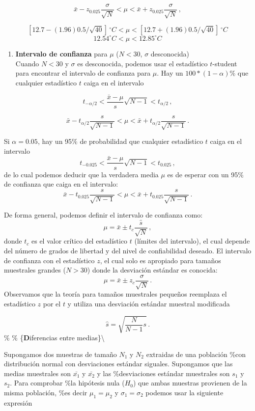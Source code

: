 \documentclass[
]{agujournal2019}
\providecommand{\tightlist}{%
  \setlength{\itemsep}{0pt}\setlength{\parskip}{0pt}}\usepackage{longtable,booktabs,array}
\begin{document}
\[\bar{x}-z_{0.025}\frac{\sigma}{\sqrt{N}}<\mu<\bar{x}+z_{0.025}\frac{\sigma}{\sqrt{N}}\,,\]

\[\left[12.7-(1.96)0.5/\sqrt{40}\right]\,^\circ{C}<\mu<\left[12.7+(1.96)0.5/\sqrt{40}\right]\,^\circ{C}\]
\[12.54^\circ{C} < \mu < 12.85^\circ{C}\]

\begin{enumerate}
\def\labelenumi{(\arabic{enumi})}
\setcounter{enumi}{1}
\tightlist
\item
  \textbf{Intervalo de confianza} para \(\mu\) (\(N<30\), \(\sigma\)
  desconocida)\\
  Cuando \(N<30\) y \(\sigma\) es desconocida, podemos usar el
  estadístico \(t\)-student para encontrar el intervalo de confianza
  para \(\mu\). Hay un \(100*(1-\alpha)\%\) que cualquier estadístico
  \(t\) caiga en el intervalo
\end{enumerate}

\[t_{-\alpha/2}<\frac{\bar{x}-\mu}{s}\sqrt{N-1}<t_{\alpha/2}\,,\]

\[\bar{x}-t_{\alpha/2}\frac{s}{\sqrt{N-1}} < \mu <
   \bar{x}+t_{\alpha/2}\frac{s}{\sqrt{N-1}}\,.\]

Si \(\alpha=0.05\), hay un 95\% de probabilidad que cualquier
estadístico \(t\) caiga en el intervalo
\[t_{-0.025}<\frac{\bar{x}-\mu}{s}\sqrt{N-1}<t_{0.025}\,,\] de lo cual
podemos deducir que la verdadera media \(\mu\) es de esperar con un 95\%
de confianza que caiga en el intervalo:
\[\bar{x}-t_{0.025}\frac{s}{\sqrt{N-1}}<\mu<\bar{x}+t_{0.025}\frac{s}{\sqrt{N-1}}\,.\]

De forma general, podemos definir el intervalo de confianza como:
\[\mu=\bar{x}\pm t_c\frac{\hat{s}}{\sqrt{N}}\,,\] donde \(t_c\) es el
valor crítico del estadístico \(t\) (límites del intervalo), el cual
depende del número de grados de libertad y del nivel de confiabilidad
deseado. El intervalo de confianza con el estadístico \(z\), el cual
solo es apropiado para tamaños muestrales grandes (\(N>30\)) donde la
desviación estándar es conocida:
\[\mu=\bar{x}\pm z_c\frac{\sigma}{\sqrt{N}}\,.\] Observamos que la
teoría para tamaños muestrales pequeños reemplaza el estadístico \(z\)
por el \(t\) y utiliza una desviación estándar muestral modificada

\[\hat{s}=\sqrt{\frac{N}{N-1}s}\,.\] \%\vspace{0.5cm} \%
\{\noindent \textbf Diferencias entre medias\}\textbackslash{}

Supongamos dos muestras de tamaño \(N_1\) y \(N_2\) extraidas de una
población \%con distribución normal con desviaciones estándar siguales.
Supongamos que las medias muestrales son \(\bar{x_1}\) y \(\bar{x_2}\) y
las \%desviaciones estándar muestrales son \(s_1\) y \(s_2\). Para
comprobar \%la hipótesis nula (\(H_0\)) que ambas muestras provienen de
la misma población, \%es decir \(\mu_1=\mu_2\) y \(\sigma_1=\sigma_2\)
podemos usar la siguiente expresión
\end{document}
